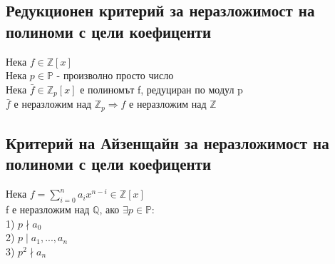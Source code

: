 \documentclass[12pt]{article}
\begin{document}
\subsection{Редукционен критерий за неразложимост на полиноми с цели коефиценти}
Нека $f \in \mathbb{Z}[x]$ \\
Нека $p \in \mathbb{P}$ - произволно просто число \\
Нека $\bar{f} \in \mathbb{Z}_p[x]$ е полиномът f, редуциран по модул p \\
$\bar{f}$ е неразложим над $\mathbb{Z}_p \Rightarrow f$ е неразложим над $\mathbb{Z}$

\subsection{Критерий на Айзенщайн за неразложимост на полиноми с цели коефиценти}
Нека $f = \sum\limits_{i=0}^{n}a_ix^{n-i} \in \mathbb{Z}[x]$ \\
f е неразложим над $\mathbb{Q}$, ако $\exists p \in \mathbb{P}: $\\
1) $p \nmid a_0$ \\
2) $p \mid a_1, ..., a_n$ \\
3) $p^2 \nmid a_n$
\end{document}
